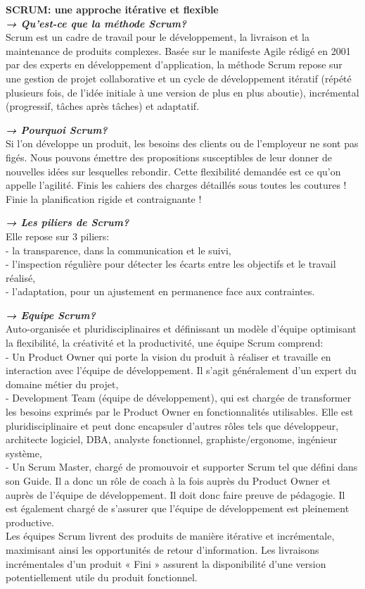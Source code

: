 \textbf{SCRUM: une approche itérative et flexible}\\

\textbf{\textit{→ Qu’est-ce que la méthode Scrum? }}\\ 
	Scrum est un cadre de travail pour le développement, la livraison et la maintenance de produits complexes. Basée sur le manifeste Agile rédigé en 2001 par des experts en développement d’application, la méthode Scrum repose sur une gestion de projet collaborative et un cycle de développement itératif (répété plusieurs fois, de l’idée initiale à une version de plus en plus aboutie), incrémental (progressif, tâches après tâches) et adaptatif. 

\textbf{\textit{→ Pourquoi Scrum? }}\\
	Si l’on développe un produit, les besoins des clients ou de l’employeur ne sont pas figés. Nous pouvons émettre des propositions susceptibles de leur donner de nouvelles idées sur lesquelles rebondir. Cette flexibilité demandée est ce qu’on appelle l’agilité. Finis les cahiers des charges détaillés sous toutes les coutures ! Finie la planification rigide et contraignante !

\textbf{\textit{→ Les piliers de Scrum? }}\\
Elle repose sur 3 piliers: \\
	- la transparence, dans la communication et le suivi,\\
	- l’inspection régulière pour détecter les écarts entre les objectifs et le travail réalisé,\\
	- l’adaptation, pour un ajustement en permanence face aux contraintes.

\textbf{\textit{→ Equipe Scrum? }}\\
	Auto-organisée et pluridisciplinaires et définissant un modèle d’équipe optimisant la flexibilité, la créativité et la productivité, une équipe Scrum comprend: \\
	- Un Product Owner  qui porte la vision du produit à réaliser et travaille en interaction avec l’équipe de développement. Il s’agit généralement d’un expert du domaine métier du projet, \\
	- Development Team (équipe de développement),  qui est chargée de transformer les besoins exprimés par le Product Owner en fonctionnalités utilisables. Elle est pluridisciplinaire et peut donc encapsuler d’autres rôles tels que développeur, architecte logiciel, DBA, analyste fonctionnel, graphiste/ergonome, ingénieur système,\\
	- Un Scrum Master, chargé de promouvoir et supporter Scrum tel que défini dans son Guide. Il a donc un rôle de coach à la fois auprès du Product Owner et auprès de l’équipe de développement. Il doit donc faire preuve de pédagogie. Il est également chargé de s’assurer que l’équipe de développement est pleinement productive.\\
Les équipes Scrum livrent des produits de manière itérative et incrémentale, maximisant ainsi les opportunités de retour d’information. Les livraisons incrémentales d’un produit « Fini » assurent la disponibilité d’une version potentiellement utile du produit fonctionnel.

